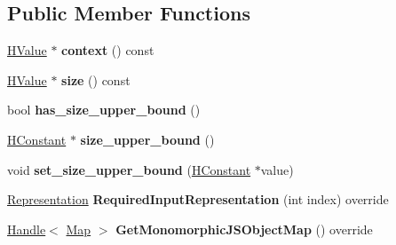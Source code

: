 \subsection*{Public Member Functions}
\begin{DoxyCompactItemize}
\item 
\hyperlink{classv8_1_1internal_1_1_h_value}{H\+Value} $\ast$ {\bfseries context} () const \hypertarget{classv8_1_1internal_1_1_h_allocate_aaaea74bb5fd6456c874100fa2e51911b}{}\label{classv8_1_1internal_1_1_h_allocate_aaaea74bb5fd6456c874100fa2e51911b}

\item 
\hyperlink{classv8_1_1internal_1_1_h_value}{H\+Value} $\ast$ {\bfseries size} () const \hypertarget{classv8_1_1internal_1_1_h_allocate_a83b6fbda289186ccff9fdbf5c16f52de}{}\label{classv8_1_1internal_1_1_h_allocate_a83b6fbda289186ccff9fdbf5c16f52de}

\item 
bool {\bfseries has\+\_\+size\+\_\+upper\+\_\+bound} ()\hypertarget{classv8_1_1internal_1_1_h_allocate_a487f9e135456b8fc9a9a707318f1b621}{}\label{classv8_1_1internal_1_1_h_allocate_a487f9e135456b8fc9a9a707318f1b621}

\item 
\hyperlink{classv8_1_1internal_1_1_h_constant}{H\+Constant} $\ast$ {\bfseries size\+\_\+upper\+\_\+bound} ()\hypertarget{classv8_1_1internal_1_1_h_allocate_aa8e155cde3fc8ce2bf7e48c63c1f290a}{}\label{classv8_1_1internal_1_1_h_allocate_aa8e155cde3fc8ce2bf7e48c63c1f290a}

\item 
void {\bfseries set\+\_\+size\+\_\+upper\+\_\+bound} (\hyperlink{classv8_1_1internal_1_1_h_constant}{H\+Constant} $\ast$value)\hypertarget{classv8_1_1internal_1_1_h_allocate_a35e36b3482ccaa5dab78587b780b195e}{}\label{classv8_1_1internal_1_1_h_allocate_a35e36b3482ccaa5dab78587b780b195e}

\item 
\hyperlink{classv8_1_1internal_1_1_representation}{Representation} {\bfseries Required\+Input\+Representation} (int index) override\hypertarget{classv8_1_1internal_1_1_h_allocate_af6e408a139b87a2bde919842e8eb6f8d}{}\label{classv8_1_1internal_1_1_h_allocate_af6e408a139b87a2bde919842e8eb6f8d}

\item 
\hyperlink{classv8_1_1internal_1_1_handle}{Handle}$<$ \hyperlink{classv8_1_1internal_1_1_map}{Map} $>$ {\bfseries Get\+Monomorphic\+J\+S\+Object\+Map} () override\hypertarget{classv8_1_1internal_1_1_h_allocate_a1a06faa472c2a594af36d37ee7deaee3}{}\label{classv8_1_1internal_1_1_h_allocate_a1a06faa472c2a594af36d37ee7deaee3}


\end{DoxyCompactItemize}
